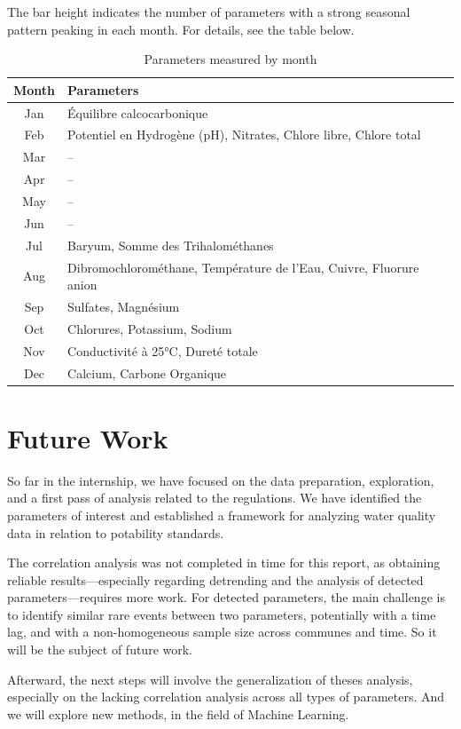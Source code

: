 \documentclass{article}
\begin{document}
\noindent
The bar height indicates the number of parameters with a strong seasonal pattern peaking in each month. For details, see the table below.

\begin{table}[H]
\centering
\begin{tabular}{|c|p{10cm}|}
\hline
\textbf{Month} & \textbf{Parameters} \\
\hline
Jan & Équilibre calcocarbonique \\
Feb & Potentiel en Hydrogène (pH), Nitrates, Chlore libre, Chlore total \\
Mar & -- \\
Apr & -- \\
May & -- \\
Jun & -- \\
Jul & Baryum, Somme des Trihalométhanes \\
Aug & Dibromochlorométhane, Température de l'Eau, Cuivre, Fluorure anion \\
Sep & Sulfates, Magnésium \\
Oct & Chlorures, Potassium, Sodium \\
Nov & Conductivité à 25°C, Dureté totale\\
Dec & Calcium, Carbone Organique \\
\hline
\end{tabular}
\caption{Parameters measured by month}
\end{table}

\section{Future Work}

So far in the internship, we have focused on the data preparation, exploration, and a first pass of analysis related to the regulations. We have identified the parameters of interest and established a framework for analyzing water quality data in relation to potability standards.

The correlation analysis was not completed in time for this report, as obtaining reliable results—especially regarding detrending and the analysis of detected parameters—requires more work. For detected parameters, the main challenge is to identify similar rare events between two parameters, potentially with a time lag, and with a non-homogeneous sample size across communes and time. So it will be the subject of future work.

Afterward, the next steps will involve the generalization of theses analysis, especially on the lacking correlation analysis across all types of parameters. And we will explore new methods, in the field of Machine Learning.
\end{document}
